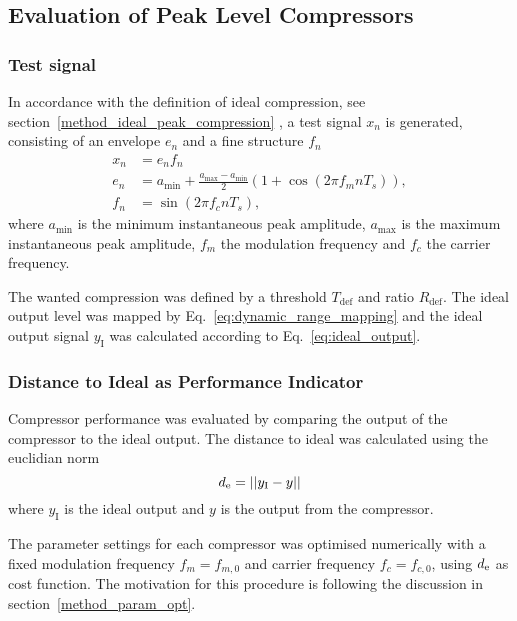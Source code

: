 \documentclass[../main2.tex]{subfiles}
\begin{document}
\subsection{Evaluation of Peak Level Compressors}\label{method_peak_compressors}
\subsubsection{Test signal}
In accordance with the definition of ideal compression, see section~\ref{method_ideal_peak_compression}
, a test signal $x_n$ is generated, consisting of an envelope $e_n$ and a fine structure $f_n$
\begin{equation}
\begin{split}
	x_n &=e_nf_n\\
	e_n &= a_\text{min} + \frac{a_\text{max}- a_\text{min}}{2} \left(1 + \cos(2 \pi f_m n T_s) \right), \\
	f_n &= \sin(2 \pi f_c n T_s),
\end{split} \label{eq:test_signal}
\end{equation}
where $a_\text{min}$ is the minimum instantaneous peak amplitude, $a_\text{max}$ is the maximum instantaneous peak amplitude, $f_m$ the modulation frequency and $f_c$ the carrier frequency.

The wanted compression was defined by a threshold $T_\text{def}$ and ratio $R_\text{def}$. The ideal output level was mapped by Eq.~\eqref{eq:dynamic_range_mapping} and the ideal output signal $y_\text{I}$ was calculated according to Eq.~\eqref{eq:ideal_output}.

\subsubsection{Distance to Ideal as Performance Indicator}
Compressor performance was evaluated by comparing the output of the compressor to the ideal output. The distance to ideal was calculated using the euclidian norm
\begin{equation}
d_\text{e} = ||y_\text{I} - y||
\end{equation}
where $y_\text{I}$ is the ideal output and $y$ is the output from the compressor.

The parameter settings for each compressor was optimised numerically with a fixed modulation frequency $f_m = f_{m,0}$ and carrier frequency $f_c = f_{c,0}$, using $d_\text{e}$ as cost function. The motivation for this procedure is following the discussion in section~\ref{method_param_opt}.
\end{document}
